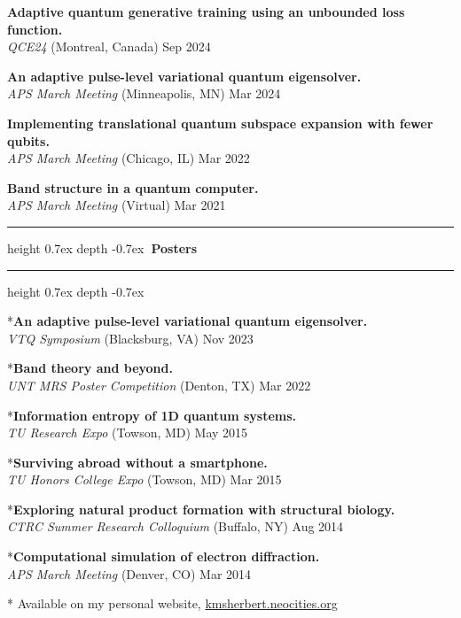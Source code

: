 \documentclass[marginmode, 10pt]{res} %
\def\Vhrulefill{\leavevmode\leaders\hrule height 0.7ex depth \dimexpr0.4pt-0.7ex\hfill\kern0pt}         %
\begin{document}
\begin{resume}
\textbf{Adaptive quantum generative training using an unbounded loss function.} \\
    \textit{QCE24} (Montreal, Canada) \hfill Sep 2024

\textbf{An adaptive pulse-level variational quantum eigensolver.} \\
    \textit{APS March Meeting} (Minneapolis, MN) \hfill Mar 2024

\textbf{Implementing translational quantum subspace expansion with fewer qubits.} \\
    \textit{APS March Meeting} (Chicago, IL) \hfill Mar 2022

\textbf{Band structure in a quantum computer.} \\
    \textit{APS March Meeting} (Virtual) \hfill Mar 2021

\Vhrulefill \textbf{~Posters~} \Vhrulefill


*\textbf{An adaptive pulse-level variational quantum eigensolver.} \\
    \textit{VTQ Symposium} (Blacksburg, VA) \hfill Nov 2023

*\textbf{Band theory and beyond.} \\
    \textit{UNT MRS Poster Competition} (Denton, TX) \hfill Mar 2022

*\textbf{Information entropy of 1D quantum systems.} \\
    \textit{TU Research Expo} (Towson, MD) \hfill May 2015

*\textbf{Surviving abroad without a smartphone.} \\
    \textit{TU Honors College Expo} (Towson, MD) \hfill Mar 2015

*\textbf{Exploring natural product formation with structural biology.} \\
    \textit{CTRC Summer Research Colloquium} (Buffalo, NY) \hfill Aug 2014

*\textbf{Computational simulation of electron diffraction.} \\
    \textit{APS March Meeting} (Denver, CO) \hfill Mar 2014

* Available on my personal website, \href{kmsherbert.neocities.org}{kmsherbert.neocities.org}


\end{resume}
\end{document}
